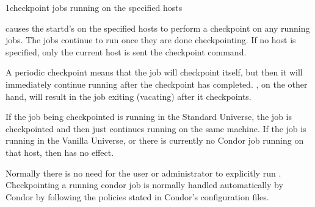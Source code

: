 \begin{ManPage}{}{1}{checkpoint jobs running on the specified hosts}
\label{man-condor-checkpoint}
\Synopsis {}

\Description
{} causes the startd's on the specified hosts to perform a 
checkpoint on any running jobs. The jobs continue to run once
they are done checkpointing. If no host is specified, only the current host is sent
the checkpoint command.

A periodic checkpoint means that the job will checkpoint itself, but then it will immediately continue running
after the checkpoint has completed. , on the other hand, will result in the job exiting (vacating) after it
checkpoints. 

If the job being checkpointed is running in the Standard Universe, the job is checkpointed and then just continues running
on the same machine. If the job is running in the Vanilla Universe, or there is currently no Condor job
running on that host, then  has no effect. 

Normally there is no need for the user or administrator to explicitly run . Checkpointing a running condor
job is normally handled automatically by Condor by following the policies stated in Condor's configuration files. 

\begin{Options}
\end{Options}

\end{ManPage}
